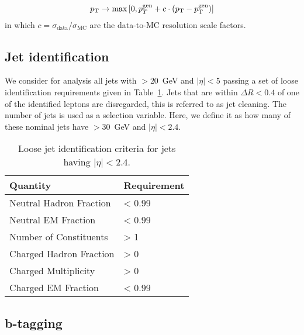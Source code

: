 \begin{equation}
p_{\rm T} \rightarrow \max \left[0 , p_{T}^{\rm gen} + c\cdot (p_{\rm T}-p_{\rm T}^{\rm gen}) \right]
\label{eq:jersmear}
\end{equation}
in which $c = \sigma_{\mathrm{data}} / \sigma_{\mathrm{MC}}$ are the data-to-MC resolution scale factors.

\subsection{Jet identification}

We consider for analysis all jets with \pt$>$20~GeV and $|\eta|<5$ passing a set of loose identification requirements given in Table~\ref{tab:loose_jet_id}.
Jets that are within $\Delta R < 0.4$ of one of the identified leptons are disregarded, this is referred to as jet cleaning.
The number of jets is used as a selection variable.
Here, we define it as how many of these nominal jets have \pt$>$30~GeV and $|\eta|<2.4$.
\begin{table}[htbp]
  \begin{center}
 {\small
  \begin{tabular} {ll}
\hline
  Quantity                  & Requirement \\
  \hline
    Neutral Hadron Fraction   & < 0.99      \\
    Neutral EM Fraction       & < 0.99      \\
    Number of Constituents    & > 1         \\
    Charged Hadron Fraction   & > 0         \\
    Charged Multiplicity      & > 0         \\
    Charged EM Fraction       & < 0.99      \\
  \hline
  \end{tabular}
}
  \caption{Loose jet identification criteria for jets having $|\eta|<2.4$. \label{tab:loose_jet_id}}
  \end{center}
\end{table}

\subsection{b-tagging}
\label{ss:btagging}

